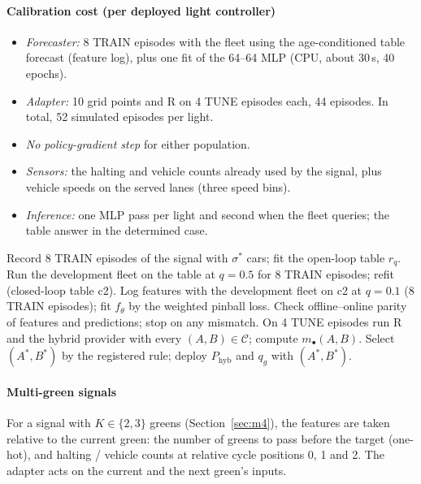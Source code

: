 \paragraph{Calibration cost (per deployed light controller)}
\begin{itemize}\setlength\itemsep{0pt}
\item \emph{Forecaster:} 8 TRAIN episodes with the fleet using the age-conditioned table forecast (feature log), plus one fit of the
64--64 MLP (CPU, about 30\,s, 40 epochs).
\item \emph{Adapter:} 10 grid points and R on 4 TUNE episodes each, 44 episodes. In total, 52 simulated episodes per light.
\item \emph{No policy-gradient step} for either population.
\item \emph{Sensors:} the halting and vehicle counts already used by the signal, plus vehicle speeds on the served lanes (three speed bins).
\item \emph{Inference:} one MLP pass per light and second when the fleet queries; the table answer in the determined case.
\end{itemize}
\begin{algorithm}[t]\caption{TSI calibration for one deployed signal controller}\label{alg:cal}
\begin{algorithmic}[1]
\STATE Record 8 TRAIN episodes of the signal with $\sigma^*$ cars; fit the open-loop table $\hat r_q$.
\STATE Run the development fleet on the table at $q=0.5$ for 8 TRAIN episodes; refit (closed-loop table c2).
\STATE Log features with the development fleet on c2 at $q=0.1$ (8 TRAIN episodes); fit $f_\theta$ by the weighted pinball loss.
\STATE Check offline--online parity of features and predictions; stop on any mismatch.
\STATE On 4 TUNE episodes run R and the hybrid provider with every $(A,B)\in\mathcal C$; compute $m_\bullet(A,B)$.
\STATE Select $(A^*,B^*)$ by the registered rule; deploy $P_{\mathrm{hyb}}$ and $q_g$ with $(A^*,B^*)$.
\end{algorithmic}\end{algorithm}
\paragraph{Multi-green signals} For a signal with $K\in\{2,3\}$ greens (Section~\ref{sec:m4}), the features are taken relative to the
current green: the number of greens to pass before the target (one-hot), and halting / vehicle counts at relative cycle positions 0, 1 and
2. The adapter acts on the current and the next green's inputs.

